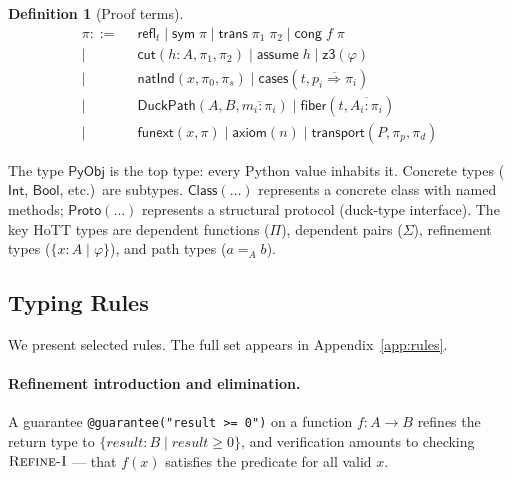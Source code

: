 \documentclass[acmsmall,nonacm,screen]{acmart}
\newtheorem{definition}[theorem]{Definition}
\newcommand{\syntype}[1]{\ensuremath{\mathsf{#1}}}
\newcommand{\pyobj}{\syntype{PyObj}}
\newcommand{\pyint}{\syntype{Int}}
\newcommand{\pybool}{\syntype{Bool}}
\newcommand{\pyclass}[1]{\syntype{Class}(#1)}
\newcommand{\pyproto}[1]{\syntype{Proto}(#1)}
\newcommand{\pathtype}[3]{#2 =_{#1} #3}
\newcommand{\reftype}[3]{\{#1 : #2 \mid #3\}}
\newcommand{\ctx}{\Gamma}
\newcommand{\jdg}[3]{#1 \vdash #2 : #3}
\newcommand{\proves}{\vdash}
\newcommand{\refl}[1]{\syntype{refl}_{#1}}
\newcommand{\funext}{\syntype{funext}}
\newcommand{\duckpath}{\ensuremath{\syntype{DuckPath}}}
\begin{document}
\begin{definition}[Proof terms]
\begin{align*}
\pi ::=\;\; & \refl{t} \mid \syntype{sym}\;\pi
  \mid \syntype{trans}\;\pi_1\;\pi_2
  \mid \syntype{cong}\;f\;\pi \\
  \mid\;\; & \syntype{cut}(h : A, \pi_1, \pi_2)
  \mid \syntype{assume}\;h
  \mid \syntype{z3}(\varphi) \\
  \mid\;\; & \syntype{natInd}(x, \pi_0, \pi_s)
  \mid \syntype{cases}(t, \overline{p_i \Rightarrow \pi_i}) \\
  \mid\;\; & \duckpath(A, B, \overline{m_i : \pi_i})
  \mid \syntype{fiber}(t, \overline{A_i : \pi_i}) \\
  \mid\;\; & \funext(x, \pi)
  \mid \syntype{axiom}(n)
  \mid \syntype{transport}(P, \pi_p, \pi_d)
\end{align*}
\end{definition}

The type $\pyobj$ is the top type: every Python value inhabits it.
Concrete types ($\pyint$, $\pybool$, etc.)~are subtypes.
$\pyclass{\ldots}$ represents a concrete class with named methods;
$\pyproto{\ldots}$ represents a structural protocol (duck-type
interface).  The key HoTT types are dependent functions ($\Pi$),
dependent pairs ($\Sigma$), refinement types ($\{x : A \mid
\varphi\}$), and path types ($\pathtype{A}{a}{b}$).

\subsection{Typing Rules}\label{sec:typing}

We present selected rules.  The full set appears in
Appendix~\ref{app:rules}.

\paragraph{Refinement introduction and elimination.}

A guarantee \texttt{@guarantee("result >= 0")} on a function
$f : A \to B$ refines the return type to
$\reftype{\mathit{result}}{B}{\mathit{result} \ge 0}$, and
verification amounts to checking $\textsc{Refine-I}$ --- that
$f(x)$ satisfies the predicate for all valid $x$.
\end{document}
